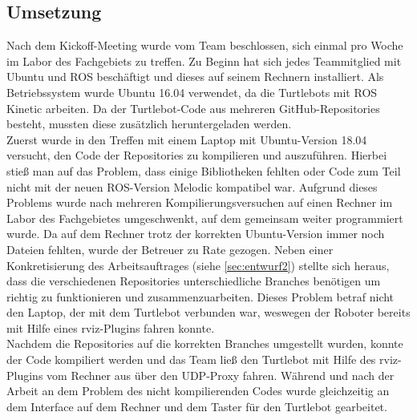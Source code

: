 \documentclass[a4paper,12pt,headsepline]{scrartcl}
\begin{document}
		
	\subsection{Umsetzung}
		Nach dem Kickoff-Meeting wurde vom Team beschlossen, sich einmal pro Woche im Labor des Fachgebiets zu treffen. Zu Beginn hat sich jedes Teammitglied mit Ubuntu und ROS beschäftigt und dieses auf seinem Rechnern installiert. Als Betriebssystem wurde Ubuntu 16.04 verwendet, da die Turtlebots mit ROS Kinetic arbeiten. Da der Turtlebot-Code aus mehreren GitHub-Repositories besteht, mussten diese zusätzlich heruntergeladen werden.\\
		Zuerst wurde in den Treffen mit einem Laptop mit Ubuntu-Version 18.04 versucht, den Code der Repositories zu kompilieren und auszuführen. Hierbei stieß man auf das Problem, dass einige Bibliotheken fehlten oder Code zum Teil nicht mit der neuen ROS-Version Melodic kompatibel war. Aufgrund dieses Problems wurde nach mehreren Kompilierungsversuchen auf einen Rechner im Labor des Fachgebietes umgeschwenkt, auf dem gemeinsam weiter programmiert wurde. Da auf dem Rechner trotz der korrekten Ubuntu-Version immer noch Dateien fehlten, wurde der Betreuer zu Rate gezogen. Neben einer Konkretisierung des Arbeitsauftrages (siehe \cref{sec:entwurf2}) stellte sich heraus, dass die verschiedenen Repositories unterschiedliche Branches benötigen um richtig zu funktionieren und zusammenzuarbeiten. Dieses Problem betraf nicht den Laptop, der mit dem Turtlebot verbunden war, weswegen der Roboter bereits mit Hilfe eines rviz-Plugins fahren konnte.\\
		Nachdem die Repositories auf die korrekten Branches umgestellt wurden, konnte der Code kompiliert werden und das Team ließ den Turtlebot mit Hilfe des rviz-Plugins vom Rechner aus über den UDP-Proxy fahren. Während und nach der Arbeit an dem Problem des nicht kompilierenden Codes wurde gleichzeitig an dem Interface auf dem Rechner und dem Taster für den Turtlebot gearbeitet.
%
\end{document}

